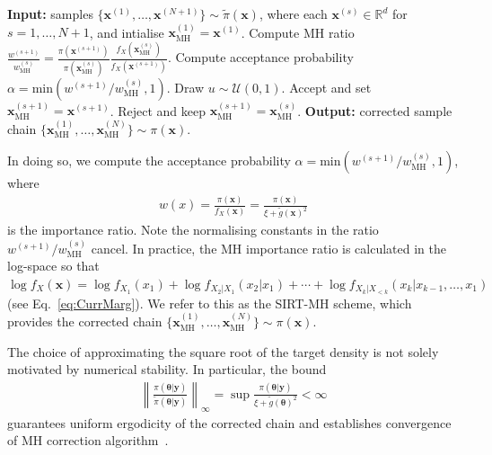 \begin{algorithm}[!ht]
	\caption{MH correction step}
	\begin{algorithmic}[1]
		\STATE \textbf{Input:} samples $\{ \bm{x}^{(1)},\dots, \bm{x}^{(N+1)} \}  \sim \tilde{\pi}(\bm{x})$, where each $\bm{x}^{(s)} \in \mathbb{R}^d$ for $s = 1, \dots, N+1$, and intialise $\bm{x}_{\text{MH}}^{(1)} = \bm{x}^{(1)}$.
		\STATE Compute MH ratio $\frac{w^{(s+1)}}{w^{(s)}_{\text{MH}} } =\frac{\pi(\bm{x}^{(s+1)})}{\pi(\bm{x}_{\text{MH}}^{(s)})} \frac{f_X(\bm{x}_{\text{MH}}^{(s)})}{f_X(\bm{x}^{(s+1)})}$.
		\STATE Compute acceptance probability $\alpha = \text{min}\left(w^{(s+1)}/w_{\text{MH}}^{(s)}, 1\right)$. 
		\STATE Draw $u \sim \mathcal{U}(0,1)$.
		\STATE Accept and set $\bm{x}_{\text{MH}}^{(s+1)} = \bm{x}^{(s+1)}$.
		\ELSE  
		\STATE Reject and keep $\bm{x}_{\text{MH}}^{(s+1)} = \bm{x}_{\text{MH}}^{(s)}$.
		\ENDIF
		\ENDFOR
		\STATE \textbf{Output:} corrected sample chain $\{ \bm{x}_{\text{MH}}^{(1)},\dots, \bm{x}_{\text{MH}}^{(N)} \} \sim \pi(\bm{x}) $.
	\end{algorithmic}
	\label{alg:MHCorr}
\end{algorithm}


In doing so, we compute the acceptance probability $  \alpha = \text{min}(w^{(s+1)}/w^{(s)}_{\text{MH}}, 1)$, where 
\begin{align}
	w(x) = \frac{\pi(\bm{x})}{f_X(\bm{x})} = \frac{\pi(\bm{x})}{\xi + \tilde{g}(\bm{x})^2} 
\end{align}
is the importance ratio.
Note the normalising constants in the ratio $w^{(s+1)}/w^{(s)}_{\text{MH}}$ cancel.
In practice, the MH importance ratio is calculated in the log-space so that $\log f_X(\bm{x})  =  \log f_{X_1}(x_1) + \log f_{X_2|X_1}(x_2|x_1) + \cdots + \log f_{X_k|X_{<k}}(x_k|x_{k-1},\dots,x_1)$ (see Eq.~\ref{eq:CurrMarg}).
We refer to this as the SIRT-MH scheme, which provides the corrected chain $\{\bm{x}_{\text{MH}}^{(1)},\dots,\bm{x}_{\text{MH}}^{(N)}\}\sim\pi(\bm{x})$.

\begin{mccorrection}
The choice of approximating the square root of the target density is not solely motivated by numerical stability. In particular, the bound
\begin{align*} 
	\left\lVert \frac{\pi( \bm{\theta} | \bm{y})}{\tilde{\pi}( \bm{\theta} | \bm{y})} \right\rVert_{\infty} = \sup \frac{\pi( \bm{\theta} | \bm{y})}{\xi + \tilde{g}(\bm{\theta})^2} < \infty 
\end{align*}
guarantees uniform ergodicity of the corrected chain and establishes convergence of MH correction algorithm~\cite{cui2022deep}.
\end{mccorrection}

